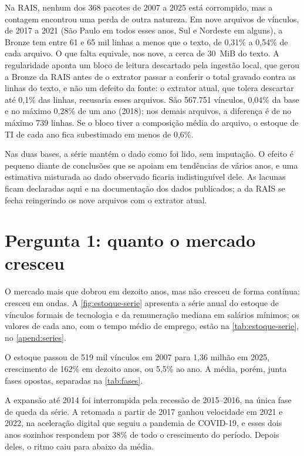 Na RAIS, nenhum dos 368 pacotes de 2007 a 2025 está corrompido, mas a contagem encontrou uma perda de outra natureza. Em nove arquivos de vínculos, de 2017 a 2021 (São Paulo em todos esses anos, Sul e Nordeste em alguns), a Bronze tem entre 61 e 65 mil linhas a menos que o texto, de 0,31\% a 0,54\% de cada arquivo. O que falta equivale, nos nove, a cerca de 30~MiB do texto. A regularidade aponta um bloco de leitura descartado pela ingestão local, que gerou a Bronze da RAIS antes de o extrator passar a conferir o total gravado contra as linhas do texto, e não um defeito da fonte: o extrator atual, que tolera descartar até 0,1\% das linhas, recusaria esses arquivos. São 567.751 vínculos, 0,04\% da base e no máximo 0,28\% de um ano (2018); nos demais arquivos, a diferença é de no máximo 739 linhas. Se o bloco tiver a composição média do arquivo, o estoque de TI de cada ano fica subestimado em menos de 0,6\%.

Nas duas bases, a série mantém o dado como foi lido, sem imputação. O efeito é pequeno diante de conclusões que se apoiam em tendências de vários anos, e uma estimativa misturada ao dado observado ficaria indistinguível dele. As lacunas ficam declaradas aqui e na documentação dos dados publicados; a da RAIS se fecha reingerindo os nove arquivos com o extrator atual.

\section{Pergunta 1: quanto o mercado cresceu}
\label{sec:resultado-q1}

O mercado mais que dobrou em dezoito anos, mas não cresceu de forma contínua: cresceu em ondas. A \autoref{fig:estoque-serie} apresenta a série anual do estoque de vínculos formais de tecnologia e da remuneração mediana em salários mínimos; os valores de cada ano, com o tempo médio de emprego, estão na \autoref{tab:estoque-serie}, no \autoref{apend:series}.



O estoque passou de 519 mil vínculos em 2007 para 1,36 milhão em 2025, crescimento de 162\% em dezoito anos, ou 5,5\% ao ano. A média, porém, junta fases opostas, separadas na \autoref{tab:fases}.



A expansão até 2014 foi interrompida pela recessão de 2015--2016, na única fase de queda da série. A retomada a partir de 2017 ganhou velocidade em 2021 e 2022, na aceleração digital que seguiu a pandemia de COVID-19, e esses dois anos sozinhos respondem por 38\% de todo o crescimento do período. Depois deles, o ritmo caiu para abaixo da média.

